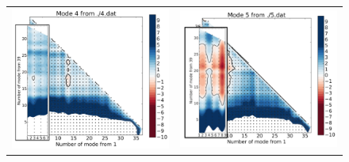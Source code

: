 	
	
	\begin{figure}[H]
		\begin{center}
			\begin{tabular}{c c}
				\includegraphics[scale=0.2]{image/image/P1-41} & \includegraphics[scale=0.2]{image/image/P1-42}\\

\end{tabular}
\end{center}
\end{figure}
